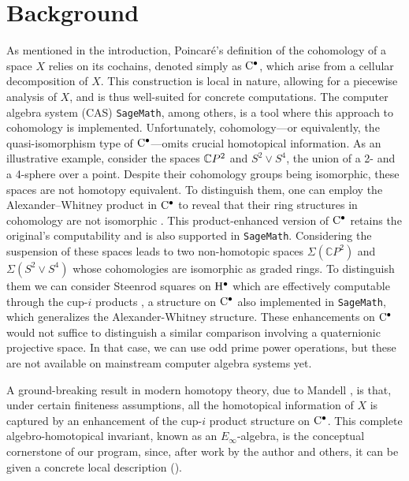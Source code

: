 
\section*{Background}

As mentioned in the introduction, Poincaré's definition of the cohomology of a space $X$ relies on its cochains, denoted simply as $\mathrm{C}^\bullet$, which arise from a cellular decomposition of $X$.
This construction is local in nature, allowing for a piecewise analysis of $X$, and is thus well-suited for concrete computations.
The computer algebra system (CAS) \texttt{SageMath}, among others, is a tool where this approach to cohomology is implemented.
Unfortunately, cohomology—or equivalently, the quasi-isomorphism type of $\mathrm{C}^\bullet$—omits crucial homotopical information.
As an illustrative example, consider the spaces $\mathbb{C} P^2$ and $S^2 \vee S^4$, the union of a 2- and a 4-sphere over a point.
Despite their cohomology groups being isomorphic, these spaces are not homotopy equivalent.
To distinguish them, one can employ the Alexander--Whitney product in $\mathrm{C}^\bullet$ to reveal that their ring structures in cohomology are not isomorphic \cite{alexander1936ring, whitney1938products}.
This product-enhanced version of $\mathrm{C}^\bullet$ retains the original's computability and is also supported in \texttt{SageMath}.
Considering the suspension of these spaces leads to two non-homotopic spaces $\Sigma(\mathbb{C} P^2)$ and $\Sigma(S^2 \vee S^4)$ whose cohomologies are isomorphic as graded rings.
To distinguish them we can consider Steenrod squares on $\mathrm{H}^\bullet$ which are effectively computable through the cup-$i$ products \cite{steenrod1947products}, a structure on $\mathrm{C}^\bullet$ also implemented in \texttt{SageMath}, which generalizes the Alexander-Whitney structure.
These enhancements on $\mathrm{C}^\bullet$ would not suffice to distinguish a similar comparison involving a quaternionic projective space.
In that case, we can use odd prime power operations, but these are not available on mainstream computer algebra systems yet.

\smallskip
A ground-breaking result in modern homotopy theory, due to Mandell \cite{mandell2006homotopy_type}, is that, under certain finiteness assumptions, all the homotopical information of $X$ is captured by an enhancement of the cup-$i$ product structure on $\mathrm{C}^\bullet$.
This complete algebro-homotopical invariant, known as an $E_\infty$-algebra, is the conceptual cornerstone of our program, since, after work by the author and others, it can be given a concrete local description (\cite{mcclure2003multivariable,berger2004combinatorial,medina2020prop1}).

